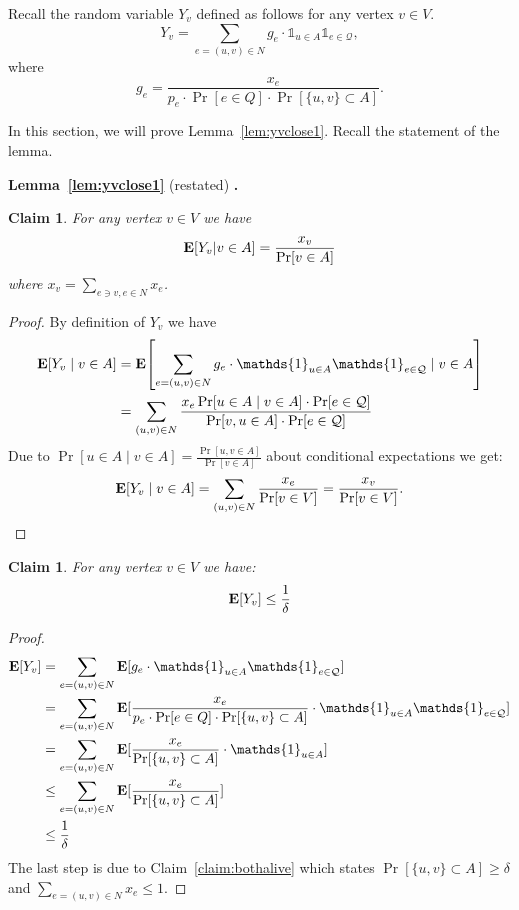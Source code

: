\documentclass[letterpaper,11pt]{article}
\DeclareMathOperator{\E}{\ensuremath{\normalfont \textbf{E}}}
\newcommand{\mc}[1]{\ensuremath{\mathcal{#1}}}
\let\originalleft\left
\let\originalright\right
\renewcommand{\left}{\mathopen{}\mathclose\bgroup\originalleft}
\renewcommand{\right}{\aftergroup\egroup\originalright}
\newtheorem{claim}[lemma]{Claim}
\renewcommand{\mc}[1]{\ensuremath{\mathcal{#1}}}
\newcommand{\restatelem}[2]{\noindent \textbf{Lemma~#1} (restated) \textbf{.} {\em #2}}
\begin{document}
Recall the random variable $Y_v$ defined as follows for any vertex $v\in V$.
$$Y_v = \sum_{e=(u,v) \in N} g_{e} \cdot\mathds{1}_{u\in A}  \mathds{1}_{e\in \mathcal{Q}},$$
where $$g_e=\frac{x_e}{p_e\cdot\Pr[e \in Q]\cdot\Pr[\{u, v\} \subset A]}.$$

In this section, we will prove Lemma~\ref{lem:yvclose1}. Recall the statement of the lemma.

\restatelem{\ref{lem:yvclose1}}{\lemyvaboutone{}}



\begin{claim}\label{claim:kjnrrfnj3r}
For any vertex $v\in V$ we have   $$\E[Y_v|v\in A] = \frac{x_v}{\Pr[v\in  A]}$$ where $x_v = \sum_{e \ni v, e \in N} x_e$.
\end{claim}
\begin{proof}
By definition of $Y_v$ we have
\begin{align*}
    \E[Y_v\mid v\in A] &= \E\left[\sum_{e=(u,v) \in N} g_{e} \cdot\mathds{1}_{u\in A}  \mathds{1}_{e\in \mathcal{Q}} \mid v\in A\right] \\& = \sum_{(u,v)\in N}\frac{x_e\Pr[u\in A \mid v\in A]\cdot \Pr[e\in \mc{Q}]}{\Pr[v, u\in A]\cdot \Pr[e\in \mc{Q}]}
\end{align*}
Due to $\Pr[u\in A \mid v\in  A] = \frac{\Pr[u,v\in A]}{\Pr[v\in A]}$ about  conditional expectations we get:  
$$\E[Y_v\mid v\in A]=\sum_{(u,v)\in  N} \frac{x_e}{\Pr[v\in V]}= \frac{x_v}{\Pr[v\in V]}.$$
\end{proof}

\begin{claim}\label{claim:expY}
     For any vertex $v\in  V$ we have:
     $$\E[Y_v]\leq \frac{1}{\delta}$$
\end{claim}
\begin{proof}
    \begin{align*}
       \E[Y_v] &= \sum_{e=(u,v) \in N} \E[g_{e} \cdot\mathds{1}_{u\in A}  \mathds{1}_{e\in \mathcal{Q}}] \\
       &= \sum_{e=(u,v) \in N} \E[\frac{x_e}{p_e\cdot\Pr[e \in Q]\cdot\Pr[\{u, v\} \subset A]} \cdot\mathds{1}_{u\in A}  \mathds{1}_{e\in \mathcal{Q}}] \\
       &= \sum_{e=(u,v) \in N} \E[\frac{x_e}{\Pr[\{u, v\} \subset A]} \cdot\mathds{1}_{u\in A}] \\
       & \leq \sum_{e=(u,v) \in N} \E[\frac{x_e}{\Pr[\{u, v\} \subset A]}] \\
       & \leq \frac{1}{\delta}
    \end{align*}
    The last step is due to Claim~\ref{claim:bothalive} which states $\Pr[\{u, v\} \subset A] \geq \delta$ and $\sum_{e=(u,v) \in N} x_e \leq 1$.
\end{proof}
\end{document}
